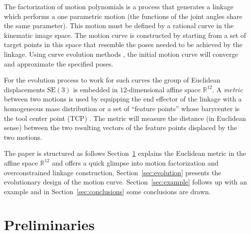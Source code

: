 \documentclass{scrartcl}
\newcommand{\SE}[1][3]{\mathrm{SE}(#1)}
\begin{document}
The factorization of motion polynomials is a process that generates a linkage which performs a one parametric motion (the functions of the joint angles share the same parameter). This motion must be defined by a rational curve in the kinematic image space. The motion curve is constructed by starting from a set of target points in this space that resemble the poses needed to be achieved by the linkage. Using curve evolution methods \cite{journal evolution curve}, the initial motion curve will converge and approximate the specified poses.

For the evolution process to work for such curves the group of Euclidean displacements $\SE$ is embedded in $12$-dimensional affine space $\mathbb{R}^{12}$. A \emph{metric} between two motions is used by equipping the end effector of the linkage with a homogeneous mass distribution or a set of ``feature points'' whose barycenter is the tool center point (TCP) \cite{journal motion metric}. The metric will measure the distance (in Euclidean sense) between the two resulting vectors of the feature points displaced by the two motions.

The paper is structured as follows Section~\ref{sec:preliminaries} explains the Euclidean metric in the affine space $\mathbb{R}^{12}$ and offers a quick glimpse into motion factorization and overconstrained linkage construction, Section~\ref{sec:evolution} presents the evolutionary design of the motion curve. Section~\ref{sec:example} follows up with an example and in Section~\ref{sec:conclusions} some conclusions are drawn.


\section{Preliminaries}
\label{sec:preliminaries}
\end{document}
